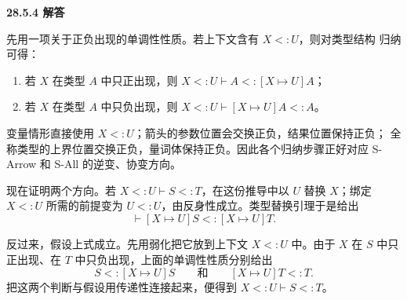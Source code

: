 \begin{taplsolutionentrybox}
\label{sol:translator:28.5.4}
\textbf{28.5.4 解答}

先用一项关于正负出现的单调性性质。若上下文含有 \(X<:U\)，则对类型结构
归纳可得：
\begin{enumerate}
  \item 若 \(X\) 在类型 \(A\) 中只正出现，则
        \(X<:U\vdash A<:[X\mapsto U]A\)；
  \item 若 \(X\) 在类型 \(A\) 中只负出现，则
        \(X<:U\vdash[X\mapsto U]A<:A\)。
\end{enumerate}
变量情形直接使用 \(X<:U\)；箭头的参数位置会交换正负，结果位置保持正负；
全称类型的上界位置交换正负，量词体保持正负。因此各个归纳步骤正好对应
S-Arrow 和 S-All 的逆变、协变方向。

现在证明两个方向。若
\(X<:U\vdash S<:T\)，在这份推导中以 \(U\) 替换 \(X\)；绑定
\(X<:U\) 所需的前提变为 \(U<:U\)，由反身性成立。类型替换引理于是给出
\[
\vdash[X\mapsto U]S<:[X\mapsto U]T.
\]

反过来，假设上式成立。先用弱化把它放到上下文 \(X<:U\) 中。由于 \(X\)
在 \(S\) 中只正出现、在 \(T\) 中只负出现，上面的单调性性质分别给出
\[
S<:[X\mapsto U]S
\qquad\text{和}\qquad
[X\mapsto U]T<:T.
\]
把这两个判断与假设用传递性连接起来，便得到
\(X<:U\vdash S<:T\)。
\end{taplsolutionentrybox}
